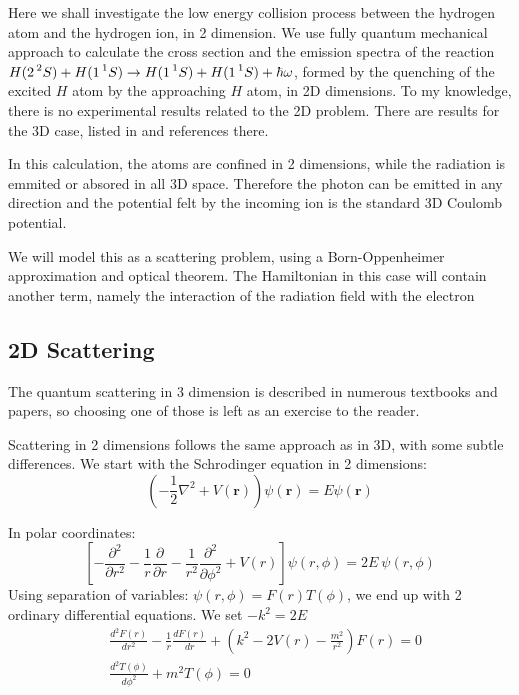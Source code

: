 Here we shall investigate the low energy collision process between the hydrogen atom and the hydrogen ion, in 2 dimension. We use fully quantum mechanical approach to calculate the cross section and the emission spectra of the reaction $ H(2\prescript{2}{}S) + H(1\prescript{1}{}S)\rightarrow H(1\prescript{1}{}S) + H(1\prescript{1}{}S) + \hbar\omega $, formed by the quenching of the excited $ H $ atom by the approaching $ H $ atom, in 2D dimensions. To my knowledge, there is no experimental results related to the 2D problem. There are results for the 3D case, listed in \cite{Zygelman88} and references there.

In this calculation, the atoms are confined in 2 dimensions, while the radiation is emmited or absored in all 3D space. Therefore the photon can be emitted in any direction and the potential felt by the incoming ion is the standard 3D Coulomb potential.

We will model this as a scattering problem, using a Born-Oppenheimer approximation and optical theorem. The Hamiltonian in this case will contain another term, namely the interaction of the radiation field with the electron

\subsection{2D Scattering}

The quantum scattering in 3 dimension is described in numerous textbooks and papers, so choosing one of those is left as an exercise to the reader.

Scattering in 2 dimensions follows the same approach as in 3D, with some subtle differences.
We start with the Schrodinger equation in 2 dimensions:
\begin{equation}\label{2DS1}
    \left(-\frac{1}{2}\nabla^2 + V(\mathbf{r})\right)\psi(\mathbf{r}) = E\psi(\mathbf{r})
\end{equation}

In polar coordinates:
\begin{equation}
    \left[-\frac{\partial^2}{\partial r^2} - \frac{1}{r}\frac{\partial}{\partial r} - \frac{1}{r^2}\frac{\partial^2}{\partial\phi^2} + V(r)\right]\psi(r,\phi) = 2E\ \psi(r,\phi)
\end{equation}
Using separation of variables: $ \psi(r,\phi) = F(r)T(\phi) $, we end up with 2 ordinary differential equations. We set $ -k^2 = 2E $
\begin{equation}
\begin{split}
 & \frac{d^2F(r)}{d r^2} -\frac{1}{r}\frac{d F(r)}{d r} +(k^2 -  2V(r) - \frac{m^2}{r^2})F(r) = 0\\[.8em]
 & \frac{d^2 T(\phi)}{d \phi^2} + m^2 T(\phi) = 0
\end{split}
\end{equation}

